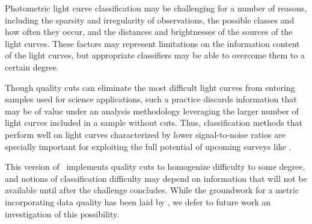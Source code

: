 Photometric light curve classification may be challenging for a number of reasons, including the sparsity and irregularity of observations, the possible classes and how often they occur, and the distances and brightnesses of the sources of the light curves.
These factors may represent limitations on the information content of the light curves, but appropriate classifiers may be able to overcome them to a certain degree.

Though quality cuts can eliminate the most difficult light curves from entering samples used for science applications, such a practice discards information that may be of value under an analysis methodology leveraging the larger number of light curves included in a sample without cuts.
Thus, classification methods that perform well on light curves characterized by lower signal-to-noise ratios are specially important for exploiting the full potential of upcoming surveys like \lsst.

This version of \plasticc\ implements quality cuts to homogenize difficulty to some degree, and notions of classification difficulty may depend on information that will not be available until after the challenge concludes.
While the groundwork for a metric incorporating data quality has been laid by \citet{wu_radio_2018}, we defer to future work an investigation of this possibility.
